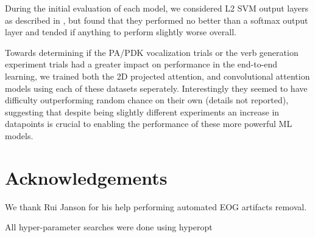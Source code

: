 \documentclass[utf8]{frontiersSCNS} %
\begin{document}
During the initial evaluation of each model, we considered L2 SVM output layers as described in \cite{l2svmuoftpaper}, but found that they performed no better than a softmax output layer and tended if anything to perform slightly worse overall.

Towards determining if the PA/PDK vocalization trials or the verb generation experiment trials had a greater impact on performance in the end-to-end learning, we trained both the 2D projected attention, and convolutional attention models using each of these datasets seperately. Interestingly they seemed to have difficulty outperforming random chance on their own (details not reported), suggesting that despite being slightly different experiments an increase in datapoints is crucial to enabling the performance of these more powerful ML models.

\section{Acknowledgements}

We thank Rui Janson for his help performing automated EOG artifacts removal.


All hyper-parameter searches were done using hyperopt \cite{Bergstra2013}


\end{document}

